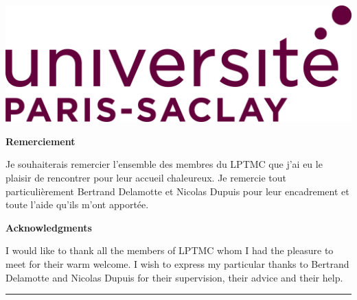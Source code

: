 \documentclass[10.5pt]{article}
\begin{document}
\begin{titlepage}
\vfill
\hfill
\includegraphics[scale=0.25]{parisSaclay.jpg}
\pagebreak

\end{titlepage}
\pagebreak

\strut
 \thispagestyle{empty}
\newpage






 \setcounter{page}{1}

\begin{flushleft}
\color{bleu}
{\fontsize{14}{14} \selectfont
	\textbf{Remerciement}}\\

\color{black}
\end{flushleft}

Je souhaiterais remercier l'ensemble des membres du LPTMC que j'ai eu le plaisir de rencontrer pour leur accueil chaleureux. Je remercie tout particulièrement Bertrand Delamotte et Nicolas Dupuis pour leur encadrement et toute l'aide qu'ils m'ont apportée.

\vspace*{11pt}

\begin{flushleft}
\color{bleu}
{\fontsize{14}{14} \selectfont
	\textbf{Acknowledgments}}\\

\color{black}
\end{flushleft}

I would like to thank all the members of LPTMC whom I had the pleasure to meet for their warm welcome. I wish to express my particular thanks to Bertrand Delamotte and Nicolas Dupuis for their supervision, their advice and their help.
\vspace*{22pt}





\begin{center}
\rule{13.7cm}{.5pt}
\end{center}
\end{document}
